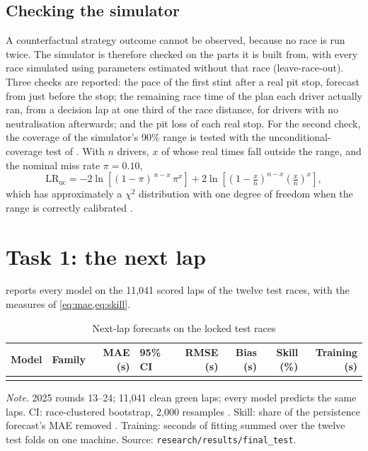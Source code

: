 \documentclass[12pt]{article}
\begin{document}
\subsection{Checking the simulator}\label{sec:simcheck}

A counterfactual strategy outcome cannot be observed, because no race is run twice. The simulator is therefore checked
on the parts it is built from, with every race simulated using parameters estimated without that race (leave-race-out).
Three checks are reported: the pace of the first stint after a real pit stop, forecast from just before the stop; the
remaining race time of the plan each driver actually ran, from a decision lap at one third of the race distance, for
drivers with no neutralisation afterwards; and the pit loss of each real stop. For the second check, the coverage of the
simulator's 90\% range is tested with the unconditional-coverage test of \textcite{kupiec1995}. With $n$ drivers, $x$ of
whose real times fall outside the range, and the nominal miss rate $\pi=0.10$,
\begin{equation}\label{eq:kupiec}
  \text{LR}_{\text{uc}} = -2\ln\!\left[(1-\pi)^{\,n-x}\,\pi^{x}\right]
  + 2\ln\!\left[\left(1-\tfrac{x}{n}\right)^{n-x}\left(\tfrac{x}{n}\right)^{x}\right],
\end{equation}
which has approximately a $\chi^2$ distribution with one degree of freedom when the range is correctly calibrated
\parencite{kupiec1995,christoffersen1998}.

\section{Task 1: the next lap}\label{sec:t1}

 reports every model on the 11,041 scored laps of the twelve test races, with the measures of
\cref{eq:mae,eq:skill}.

\begin{table}[htbp]
\centering
\caption{Next-lap forecasts on the locked test races}\label{tab:t1}
\begin{threeparttable}
\footnotesize
\begin{tabularx}{\textwidth}{Llrlrrrr}
\toprule
Model & Family & MAE (s) & 95\% CI & RMSE (s) & Bias (s) & Skill (\%) & Training (s)\\
\midrule
{}
\bottomrule
\end{tabularx}
\begin{tablenotes}\footnotesize
\item \textit{Note.} 2025 rounds 13--24; 11,041 clean green laps; every model predicts the same laps. CI: race-clustered
bootstrap, 2,000 resamples \parencite{cameron2008}. Skill: share of the persistence forecast's MAE removed
\parencite{hyndman2006}. Training: seconds of fitting summed over the twelve test folds on one machine. Source:
\texttt{research/results/final\_test}.
\end{tablenotes}
\end{threeparttable}
\end{table}
\end{document}

